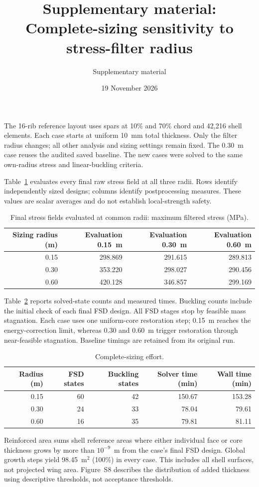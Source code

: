 \documentclass[11pt,a4paper]{article}
\title{Supplementary material: Complete-sizing sensitivity to stress-filter radius}
\author{Supplementary material}
\date{19 November 2026}
\begin{document}
\maketitle
The 16-rib reference layout uses spars at 10\% and 70\% chord and 42,216 shell elements. Each case starts at uniform 10~mm total thickness. Only the filter radius changes; all other analysis and sizing settings remain fixed. The 0.30~m case reuses the audited saved baseline. The new cases were solved to the same own-radius stress and linear-buckling criteria.

Table~\ref{tab:cross} evaluates every final raw stress field at all three radii. Rows identify independently sized designs; columns identify postprocessing measures. These values are scalar averages and do not establish local-strength safety.
\begin{table}[h]\centering
\caption{Final stress fields evaluated at common radii: maximum filtered stress (MPa).}\label{tab:cross}
\begin{tabular}{rrrr}\toprule
Sizing radius (m) & Evaluation 0.15~m & Evaluation 0.30~m & Evaluation 0.60~m\\\midrule
0.15 & 298.869 & 291.615 & 289.813\\
0.30 & 353.220 & 298.027 & 290.456\\
0.60 & 420.128 & 346.857 & 299.169\\
\bottomrule\end{tabular}\end{table}
Table~\ref{tab:effort} reports solved-state counts and measured times. Buckling counts include the initial check of each final FSD design. All FSD stages stop by feasible mass stagnation. Each case uses one uniform-core restoration step; 0.15~m reaches the energy-correction limit, whereas 0.30 and 0.60~m trigger restoration through near-feasible stagnation. Baseline timings are retained from its original run.
\begin{table}[h]\centering\small
\caption{Complete-sizing effort.}\label{tab:effort}
\begin{tabular}{rrrrr}\toprule
Radius (m) & FSD states & Buckling states & Solver time (min) & Wall time (min)\\\midrule
0.15 & 60 & 42 & 150.67 & 153.28\\
0.30 & 24 & 33 & 78.04 & 79.61\\
0.60 & 16 & 35 & 79.81 & 81.11\\
\bottomrule\end{tabular}\end{table}
\noindent Reinforced area sums shell reference areas where either individual face or core thickness grows by more than $10^{-9}$~m from the case's final FSD design. Global growth steps yield 98.45~m$^2$ (100\%) in every case. This includes all shell surfaces, not projected wing area. Figure~S8 describes the distribution of added thickness using descriptive thresholds, not acceptance thresholds.
\setcounter{figure}{2}
\end{document}
